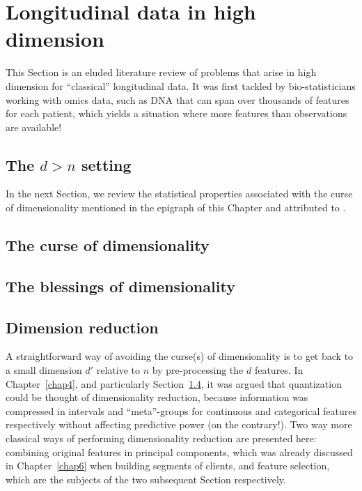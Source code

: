 \section{Longitudinal data in high dimension}

This Section is an eluded literature review of problems that arise in high dimension for ``classical'' longitudinal data. It was first tackled by bio-statisticians working with omics data, such as DNA that can span over thousands of features for each patient, which yields a situation where more features than observations are available!

\subsection{The $d > n$ setting}

In the next Section, we review the statistical properties associated with the curse of dimensionality mentioned in the epigraph of this Chapter and attributed to .

\subsection{The curse of dimensionality}


\subsection{The blessings of dimensionality}


\subsection{Dimension reduction}

A straightforward way of avoiding the curse(s) of dimensionality is to get back to a small dimension $d'$ relative to $n$ by pre-processing the $d$ features. In Chapter~\ref{chap4}, and particularly Section~\ref{}, it was argued that quantization could be thought of dimensionality reduction, because information was compressed in intervals and ``meta''-groups for continuous and categorical features respectively without affecting predictive power (on the contrary!). Two way more classical ways of performing dimensionality reduction are presented here: combining original features in principal components, which was already discussed in Chapter~\ref{chap6} when building segments of clients, and feature selection, which are the subjects of the two subsequent Section respectively.

